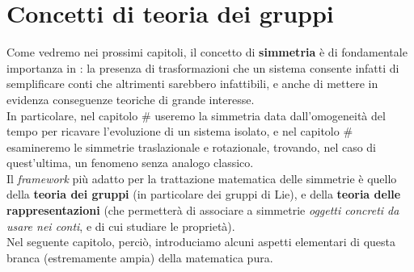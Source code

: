\documentclass[../../FisicaTeorica.tex]{subfiles}
\begin{document}
\section{Concetti di teoria dei gruppi}
Come vedremo nei prossimi capitoli, il concetto di \textbf{simmetria} è di fondamentale importanza in \MQ: la presenza di trasformazioni che  un sistema consente infatti di semplificare conti che altrimenti sarebbero infattibili, e anche di mettere in evidenza conseguenze teoriche di grande interesse.\\
In particolare, nel capitolo \# %
 useremo la simmetria data dall'omogeneità del tempo per ricavare l'evoluzione di un sistema isolato, e nel capitolo \# %
esamineremo le simmetrie traslazionale e rotazionale, trovando, nel caso di quest'ultima, un fenomeno senza analogo classico.\\
Il \textit{framework} più adatto per la trattazione matematica delle simmetrie è quello della \textbf{teoria dei gruppi} (in particolare dei gruppi di Lie), e della \textbf{teoria delle rappresentazioni} (che permetterà di associare a simmetrie  \textit{oggetti concreti da usare nei conti}, e di cui studiare le proprietà).\\
Nel seguente capitolo, perciò, introduciamo alcuni aspetti elementari di questa branca (estremamente ampia) della matematica pura.
\end{document}
